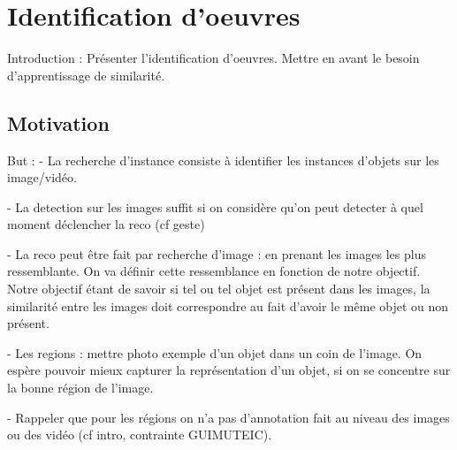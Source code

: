 
\chapter{Identification d'oeuvres}


Introduction :
Présenter l'identification d'oeuvres.
Mettre en avant le besoin d'apprentissage de similarité.
%

\section{Motivation}
\label{sec:similaritemotivation}


But : 
 - La recherche d'instance consiste à identifier les instances d'objets sur les image/vidéo.
 
 - La detection sur les images suffit si on considère qu'on peut detecter à quel moment déclencher la reco (cf geste)
 
 - La reco peut être fait par recherche d'image : en prenant les images les plus ressemblante. On va définir cette ressemblance en fonction de notre objectif. Notre objectif étant de savoir si tel ou tel objet est présent dans les images, la similarité entre les images doit correspondre au fait d'avoir le même objet ou non présent.
 
 - Les regions : mettre photo exemple d'un objet dans un coin de l'image. On espère pouvoir mieux capturer la représentation d'un objet, si on se concentre sur la bonne région de l'image.
 
 - Rappeler que pour les régions on n'a pas d'annotation fait au niveau des images ou des vidéo (cf intro, contrainte GUIMUTEIC).
 


